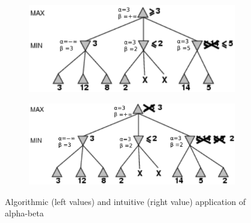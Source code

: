 \begin{figure}[H]
\begin{subfigure}{.4\textwidth}
    \end{subfigure}
    \begin{subfigure}{.4\textwidth}
        \centering
        \includegraphics[width=\linewidth]{img/alphabeta_algo_example4.png}
    \end{subfigure}
    \begin{subfigure}{.4\textwidth}
        \centering
        \includegraphics[width=\linewidth]{img/alphabeta_algo_example5.png}
    \end{subfigure}
    \caption{Algorithmic (left values) and intuitive (right value) application of alpha-beta}
\end{figure}
